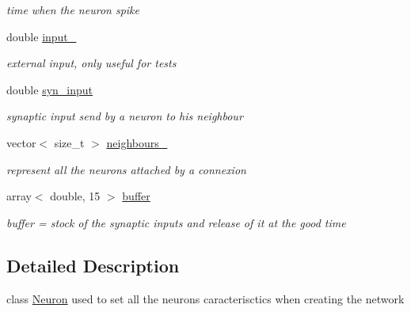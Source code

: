 \begin{DoxyCompactItemize}
\begin{DoxyCompactList}\small\item\em time when the neuron spike \end{DoxyCompactList}\item 
\hypertarget{classNeuron_a9ed47eb032d964fdebc77bca888226fa}{double \hyperlink{classNeuron_a9ed47eb032d964fdebc77bca888226fa}{input\-\_\-}}\label{classNeuron_a9ed47eb032d964fdebc77bca888226fa}

\begin{DoxyCompactList}\small\item\em external input, only useful for tests \end{DoxyCompactList}\item 
\hypertarget{classNeuron_add16f88ac5bb74f22d8801bdebcddf38}{double \hyperlink{classNeuron_add16f88ac5bb74f22d8801bdebcddf38}{syn\-\_\-input}}\label{classNeuron_add16f88ac5bb74f22d8801bdebcddf38}

\begin{DoxyCompactList}\small\item\em synaptic input send by a neuron to his neighbour \end{DoxyCompactList}\item 
\hypertarget{classNeuron_a363bb83c58778315c9c384c05df9948a}{vector$<$ size\-\_\-t $>$ \hyperlink{classNeuron_a363bb83c58778315c9c384c05df9948a}{neighbours\-\_\-}}\label{classNeuron_a363bb83c58778315c9c384c05df9948a}

\begin{DoxyCompactList}\small\item\em represent all the neurons attached by a connexion \end{DoxyCompactList}\item 
\hypertarget{classNeuron_adaa6ad5e0febdab056ed73d59ce45044}{array$<$ double, 15 $>$ \hyperlink{classNeuron_adaa6ad5e0febdab056ed73d59ce45044}{buffer}}\label{classNeuron_adaa6ad5e0febdab056ed73d59ce45044}

\begin{DoxyCompactList}\small\item\em buffer = stock of the synaptic inputs and release of it at the good time \end{DoxyCompactList}\end{DoxyCompactItemize}


\subsection{Detailed Description}
class \hyperlink{classNeuron}{Neuron} used to set all the neurons caracterisctics when creating the network 

